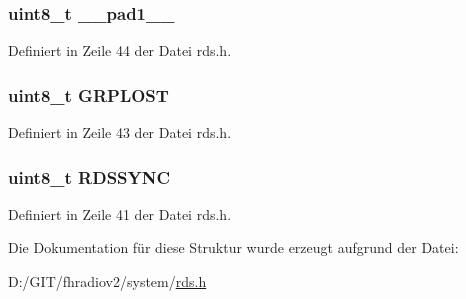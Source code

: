 \subsubsection[{\+\_\+\+\_\+pad1\+\_\+\+\_\+}]{\setlength{\rightskip}{0pt plus 5cm}uint8\+\_\+t \+\_\+\+\_\+pad1\+\_\+\+\_\+}\label{structsync_a77f12d2e278bd5c07712648ac0df5e08}


Definiert in Zeile 44 der Datei rds.\+h.

\hypertarget{structsync_a430b332cff3a3786c4854defcd95d078}{}
\subsubsection[{G\+R\+P\+L\+O\+S\+T}]{\setlength{\rightskip}{0pt plus 5cm}uint8\+\_\+t G\+R\+P\+L\+O\+S\+T}\label{structsync_a430b332cff3a3786c4854defcd95d078}


Definiert in Zeile 43 der Datei rds.\+h.

\hypertarget{structsync_acdf4253982980384be3340fd9a9ab7c5}{}
\subsubsection[{R\+D\+S\+S\+Y\+N\+C}]{\setlength{\rightskip}{0pt plus 5cm}uint8\+\_\+t R\+D\+S\+S\+Y\+N\+C}\label{structsync_acdf4253982980384be3340fd9a9ab7c5}


Definiert in Zeile 41 der Datei rds.\+h.



Die Dokumentation für diese Struktur wurde erzeugt aufgrund der Datei\+:\begin{DoxyCompactItemize}
\item 
D\+:/\+G\+I\+T/fhradiov2/system/\hyperlink{rds_8h}{rds.\+h}\end{DoxyCompactItemize}
